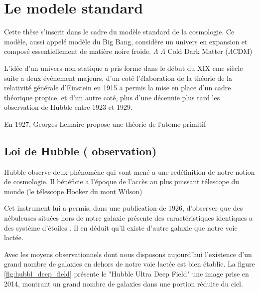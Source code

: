 \chapter{ Le modele standard } \label{ch:introduction_physique}

Cette thèse s'inscrit dans le cadre du modèle standard de la cosmologie.
Ce modèle, aussi appelé modèle du Big Bang, considère un univers en expansion et composé essentiellement de matière noire froide.%
$\Lambda$
 $\Lambda$ Cold Dark Matter ($\Lambda$CDM)

L'idée d'un univers non statique a pris forme dans le début du XIX eme siècle suite a deux événement majeurs, d'un coté l'élaboration de la théorie de la relativité générale d'Einstein en 1915 a permis la mise en place d'un cadre théorique propice, et d'un autre coté, plus d'une décennie plus tard les observation de Hubble entre 1923 et 1929.

En 1927, Georges Lemaire propose une théorie de l'atome primitif \cite{1927ASSB...47...49L} 



\section{Loi de Hubble ( observation) }


Hubble observe deux phénomène qui vont mené a une redéfinition de notre notion de cosmologie.
Il bénéficie a l'époque de l'accès au plus puissant télescope du monde (le télescope Hooker du mont Wilson)

Cet instrument lui a permis, dans une publication de 1926, d'observer que des nébuleuses situées hors de notre galaxie présente des caractéristiques identiques a des système d'étoiles \citep{1926ApJ....63..236H}.
Il en déduit qu'il existe d'autre galaxie que notre voie lactée.

Avec les moyens observationnels dont nous disposons aujourd'hui l’existence d'un grand nombre de galaxies en dehors de notre voie lactée est bien établie.
La figure \ref{fig:hubbl_deep_field} présente le "Hubble Ultra Deep Field" \citep{1538-3881-132-5-1729} une image prise en 2014, montrant un grand nombre de galaxies dans une portion réduite du ciel.

